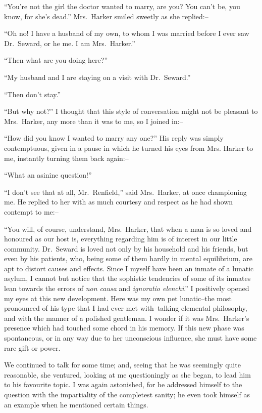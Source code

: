 \documentclass[12pt,openright]{book}
\begin{document}
“You’re not the girl the doctor wanted to marry, are you? You can’t be, you know, for she’s dead.” Mrs. Harker smiled sweetly as she replied:–

“Oh no! I have a husband of my own, to whom I was married before I ever saw Dr. Seward, or he me. I am Mrs. Harker.”

“Then what are you doing here?”

“My husband and I are staying on a visit with Dr. Seward.”

“Then don’t stay.”

“But why not?” I thought that this style of conversation might not be pleasant to Mrs. Harker, any more than it was to me, so I joined in:–

“How did you know I wanted to marry any one?” His reply was simply contemptuous, given in a pause in which he turned his eyes from Mrs. Harker to me, instantly turning them back again:–

“What an asinine question!”

“I don’t see that at all, Mr. Renfield,” said Mrs. Harker, at once championing me. He replied to her with as much courtesy and respect as he had shown contempt to me:–

“You will, of course, understand, Mrs. Harker, that when a man is so loved and honoured as our host is, everything regarding him is of interest in our little community. Dr. Seward is loved not only by his household and his friends, but even by his patients, who, being some of them hardly in mental equilibrium, are apt to distort causes and effects. Since I myself have been an inmate of a lunatic asylum, I cannot but notice that the sophistic tendencies of some of its inmates lean towards the errors of \textit{non causa} and \textit{ignoratio elenchi}.” I positively opened my eyes at this new development. Here was my own pet lunatic–the most pronounced of his type that I had ever met with–talking elemental philosophy, and with the manner of a polished gentleman. I wonder if it was Mrs. Harker’s presence which had touched some chord in his memory. If this new phase was spontaneous, or in any way due to her unconscious influence, she must have some rare gift or power.

We continued to talk for some time; and, seeing that he was seemingly quite reasonable, she ventured, looking at me questioningly as she began, to lead him to his favourite topic. I was again astonished, for he addressed himself to the question with the impartiality of the completest sanity; he even took himself as an example when he mentioned certain things.
\end{document}
